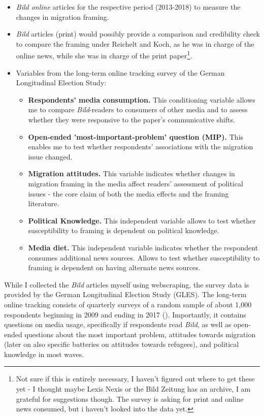 \documentclass{article}
\begin{document}
\begin{itemize}
    \item \textit{Bild online} articles for the respective period (2013-2018) to measure the changes in migration framing.
    \item \textit{Bild} articles (print) would possibly provide a comparison and credibility check to compare the framing under Reichelt and Koch, as he was in charge of the online news, while she was in charge of the print paper\footnote{Not sure if this is entirely necessary, I haven't figured out where to get these yet - I thought maybe Lexis Nexis or the Bild Zeitung has an archive, I am grateful for suggestions though. The survey is asking for print and online news consumed, but i haven't looked into the data yet.}.
    \item Variables from the long-term online tracking survey of the German Longitudinal Election Study:
    \begin{itemize}
        \item \textbf{Respondents' media consumption.} This conditioning variable allows me to compare \textit{Bild}-readers to consumers of other media and to assess whether they were responsive to the paper's communicative shifts.
        \item \textbf{Open-ended 'most-important-problem' question (MIP).} This enables me to test whether respondents' associations with the migration issue changed.
        \item \textbf{Migration attitudes.} This variable indicates whether changes in migration framing in the media affect readers' assessment of political issues - the core claim of both the media effects and the framing literature.
        \item \textbf{Political Knowledge.} This independent variable allows to test whether susceptibility to framing is dependent on political knowledge.
        \item \textbf{Media diet.} This independent variable indicates whether the respondent consumes additional news sources. Allows to test whether susceptibility to framing is dependent on having alternate news sources.
    \end{itemize}
\end{itemize}

While I collected the \textit{Bild} articles myself using webscraping, the survey data is provided by the German Longitudinal Election Study (GLES). The long-term online tracking consists of quarterly surveys of a random sample of about 1,000 respondents beginning in 2009 and ending in 2017 (\cite{GLES2019LongTermTracking}). Importantly, it contains questions on media usage, specifically if respondents read \textit{Bild}, as well as open-ended questions about the most important problem, attitudes towards migration (later on also specific batteries on attitudes towards refugees), and political knowledge in most waves.
\end{document}
